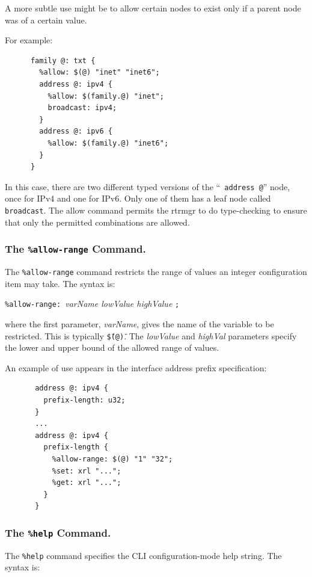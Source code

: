 \documentclass[11pt]{article}
\begin{document}
A more subtle use might be to allow certain nodes to exist only if a
parent node was of a certain value.

For example:

\begin{verbatim}
      family @: txt {
        %allow: $(@) "inet" "inet6";
        address @: ipv4 {
          %allow: $(family.@) "inet";
          broadcast: ipv4;
        }
        address @: ipv6 {
          %allow: $(family.@) "inet6";
        }
      }
\end{verbatim}

In this case, there are two different typed versions of the ``{\tt
address @}'' node, once for IPv4 and one for IPv6.  Only one of them has
a leaf node called {\tt broadcast}.  The allow command permits the
rtrmgr to do type-checking to ensure that only the permitted
combinations are allowed.

\subsubsection{The {\tt \%allow-range} Command.}

The {\tt \%allow-range} command restricts the range of values an
integer configuration item may take.  The syntax is:

\texttt{\%allow-range: }{\it varName lowValue highValue} \texttt{;}

\noindent where the first parameter, \textit{varName}, gives the name
of the variable to be restricted.  This is typically
\texttt{\"\$(@)\"}.  The {\it lowValue} and {\it highVal} parameters
specify the lower and upper bound of the allowed range of values.

An example of use appears in the interface address prefix
specification:

\begin{verbatim}
       address @: ipv4 {
         prefix-length: u32;
       }
       ...
       address @: ipv4 {
         prefix-length {
           %allow-range: $(@) "1" "32";
           %set: xrl "...";
           %get: xrl "...";
         }
       }
\end{verbatim}

\subsubsection{The {\tt \%help} Command.}

The {\tt \%help} command specifies the CLI configuration-mode help string.
The syntax is:
\end{document}
